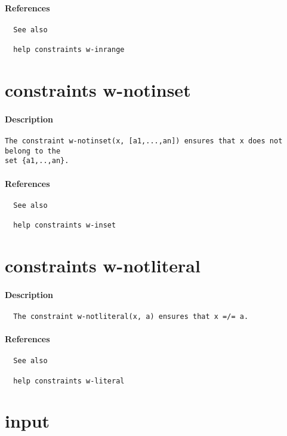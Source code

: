 \paragraph{References}
{\footnotesize
\begin{verbatim}
  See also

  help constraints w-inrange
\end{verbatim}
}
\section{constraints w-notinset}
\paragraph{Description}
{\footnotesize
\begin{verbatim}
The constraint w-notinset(x, [a1,...,an]) ensures that x does not belong to the
set {a1,..,an}.
\end{verbatim}
}
\paragraph{References}
{\footnotesize
\begin{verbatim}
  See also

  help constraints w-inset
\end{verbatim}
}
\section{constraints w-notliteral}
\paragraph{Description}
{\footnotesize
\begin{verbatim}
  The constraint w-notliteral(x, a) ensures that x =/= a.
\end{verbatim}
}
\paragraph{References}
{\footnotesize
\begin{verbatim}
  See also

  help constraints w-literal
\end{verbatim}
}
\section{input}
